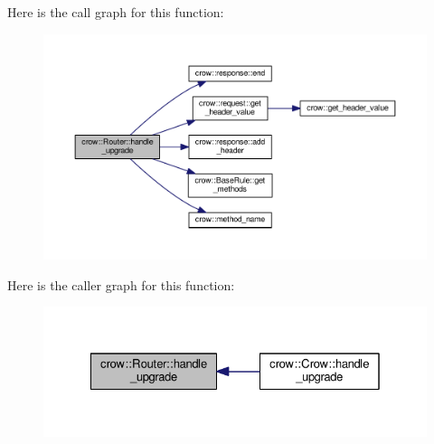 Here is the call graph for this function\-:
\nopagebreak
\begin{figure}[H]
\begin{center}
\leavevmode
\includegraphics[width=350pt]{classcrow_1_1_router_a2b37f05675d075c3de79f6a4de42320d_cgraph}
\end{center}
\end{figure}




Here is the caller graph for this function\-:
\nopagebreak
\begin{figure}[H]
\begin{center}
\leavevmode
\includegraphics[width=326pt]{classcrow_1_1_router_a2b37f05675d075c3de79f6a4de42320d_icgraph}
\end{center}
\end{figure}


